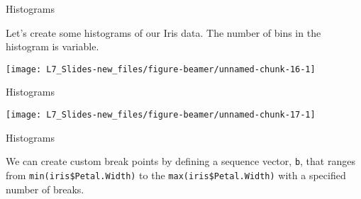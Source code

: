 \documentclass[ignorenonframetext,]{beamer}
\newenvironment{Shaded}{\begin{snugshade}}{\end{snugshade}}
\newcommand{\KeywordTok}[1]{\textcolor{white}{\textbf{{#1}}}}
\newcommand{\NormalTok}[1]{\textcolor{yellow}{{#1}}}
\newcommand{\DataTypeTok}[1]{\textcolor{yellow}{{#1}}}
\newcommand{\DecValTok}[1]{\textcolor{numbercolor}{{#1}}}
\newcommand{\StringTok}[1]{\textcolor{yellow}{{#1}}}
\begin{document}
\begin{frame}[fragile]{Histograms}

Let's create some histograms of our Iris data. The number of bins in the
histogram is variable.

\small

\begin{Shaded}
\end{Shaded}

\begin{center}\texttt{[image: L7\_Slides-new\_files/figure-beamer/unnamed-chunk-16-1]} \end{center}

\end{frame}

\begin{frame}[fragile]{Histograms}

\small

\begin{Shaded}
\end{Shaded}

\begin{center}\texttt{[image: L7\_Slides-new\_files/figure-beamer/unnamed-chunk-17-1]} \end{center}

\end{frame}

\begin{frame}[fragile]{Histograms}

We can create custom break points by defining a sequence vector,
\texttt{b}, that ranges from \texttt{min(iris\$Petal.Width)} to the
\texttt{max(iris\$Petal.Width)} with a specified number of breaks.

\small

\begin{Shaded}
\end{Shaded}

\end{frame}
\end{document}
